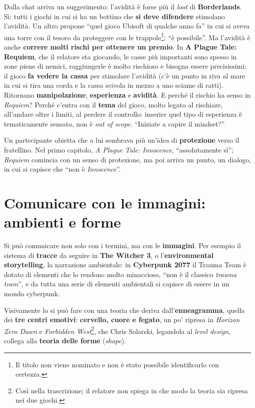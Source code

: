 Dalla chat arriva un suggerimento: l'avidità è forse più il \emph{loot} di
\textbf{Borderlands}. Sì: tutti i giochi in cui si ha un bottino che \textbf{si
deve difendere} stimolano l'avidità. Un altro propone ``quel gioco Ubisoft di
qualche anno fa'' in cui si aveva una torre con il tesoro da proteggere con le
trappole\footnote{Il titolo non viene nominato e non è stato possibile
identificarlo con certezza.}: ``è possibile''. Ma l'avidità è anche \textbf{correre
molti rischi per ottenere un premio}. In \textbf{A Plague Tale: Requiem}, che il
relatore sta giocando, le casse più importanti sono spesso in zone piene di
nemici, raggiungerle è molto rischioso e bisogna essere precisissimi; il gioco
\textbf{fa vedere la cassa} per stimolare l'avidità (c'è un punto in riva al mare
in cui si tira una corda e la cassa scivola in mezzo a uno sciame di ratti).
Ritornano \textbf{manipolazione}, \textbf{esperienza} e \textbf{avidità}. E perché
il rischio ha senso in \emph{Requiem}? Perché c'entra con il \textbf{tema} del
gioco, molto legato al rischiare, all'andare oltre i limiti, al perdere il
controllo: inserire quel tipo di esperienza è tematicamente sensato, non è
\emph{out of scope}. ``Iniziate a capire il mindset?''

Un partecipante obietta che a lui sembrava più un'idea di \textbf{protezione}
verso il fratellino. Nel primo capitolo, \emph{A Plague Tale: Innocence},
``assolutamente sì''; \emph{Requiem} comincia con un senso di protezione, ma poi
arriva un punto, un dialogo, in cui si capisce che ``non è \emph{Innocence}''.

\section{Comunicare con le immagini: ambienti e forme}
\label{sec:z6-forme}

Si può comunicare non solo con i termini, ma con le \textbf{immagini}. Per esempio
il sistema di \textbf{tracce} da seguire in \textbf{The Witcher 3}, o
l'\textbf{environmental storytelling}, la narrazione ambientale: in
\textbf{Cyberpunk 2077} il Trauma Team è dotato di elementi che lo rendono molto
minaccioso, ``non è il classico \emph{trauma team}'', e da tutta una serie di
elementi ambientali si capisce di essere in un mondo cyberpunk.

Visivamente lo si può fare con una teoria che deriva dall'\textbf{enneagramma},
quella dei \textbf{tre centri emotivi}: \textbf{cervello, cuore e fegato}, un po'
ripresa in \emph{Horizon Zero Dawn} e \emph{Forbidden West}\footnote{Così nella
trascrizione; il relatore non spiega in che modo la teoria sia ripresa nei due
giochi.}, che Chris Solarski, legandola al \emph{level design}, collega alla
\textbf{teoria delle forme} (\emph{shape}).

